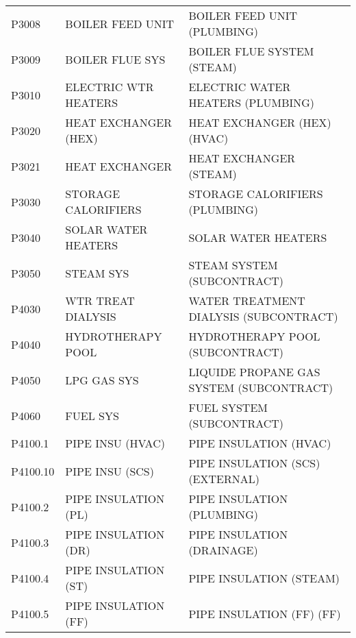 \begin{longtable}[l]{l%
                  l|%
                  l|}
\rowcolor{thetableheadbgcolor!0.25!white} P3008       & BOILER FEED UNIT   & BOILER FEED UNIT (PLUMBING)   \\
\rowcolor{thetableheadbgcolor!0.25!white} P3009       & BOILER FLUE SYS   & BOILER FLUE SYSTEM (STEAM)   \\
\rowcolor{thetableheadbgcolor!0.25!white} P3010       & ELECTRIC WTR HEATERS   & ELECTRIC WATER HEATERS (PLUMBING)   \\
\rowcolor{thetableheadbgcolor!0.25!white} P3020       & HEAT EXCHANGER (HEX)   & HEAT EXCHANGER (HEX) (HVAC)   \\
\rowcolor{thetableheadbgcolor!0.25!white} P3021       & HEAT EXCHANGER   & HEAT EXCHANGER (STEAM)   \\
\rowcolor{thetableheadbgcolor!0.25!white} P3030       & STORAGE CALORIFIERS   & STORAGE CALORIFIERS (PLUMBING)   \\
\rowcolor{thetableheadbgcolor!0.25!white} P3040       & SOLAR WATER HEATERS   & SOLAR WATER HEATERS   \\
\rowcolor{thetableheadbgcolor!0.25!white} P3050       & STEAM SYS   & STEAM SYSTEM (SUBCONTRACT)   \\
\rowcolor{thetableheadbgcolor!0.25!white} P4030       & WTR TREAT DIALYSIS   & WATER TREATMENT DIALYSIS (SUBCONTRACT)   \\
\rowcolor{thetableheadbgcolor!0.25!white} P4040       & HYDROTHERAPY POOL   & HYDROTHERAPY POOL (SUBCONTRACT)   \\
\rowcolor{thetableheadbgcolor!0.25!white} P4050       & LPG GAS SYS   & LIQUIDE PROPANE GAS SYSTEM (SUBCONTRACT)   \\
\rowcolor{thetableheadbgcolor!0.25!white} P4060       & FUEL SYS   & FUEL SYSTEM (SUBCONTRACT)   \\
\rowcolor{thetableheadbgcolor!0.25!white} P4100.1     & PIPE INSU (HVAC)   & PIPE INSULATION (HVAC)   \\
\rowcolor{thetableheadbgcolor!0.25!white} P4100.10    & PIPE INSU (SCS)   & PIPE INSULATION (SCS) (EXTERNAL)   \\
\rowcolor{thetableheadbgcolor!0.25!white} P4100.2     & PIPE INSULATION (PL)   & PIPE INSULATION (PLUMBING)   \\
\rowcolor{thetableheadbgcolor!0.25!white} P4100.3     & PIPE INSULATION (DR)   & PIPE INSULATION (DRAINAGE)   \\
\rowcolor{thetableheadbgcolor!0.25!white} P4100.4     & PIPE INSULATION (ST)   & PIPE INSULATION (STEAM)   \\
\rowcolor{thetableheadbgcolor!0.25!white} P4100.5     & PIPE INSULATION (FF)   & PIPE INSULATION (FF) (FF)   \\

\end{longtable}

